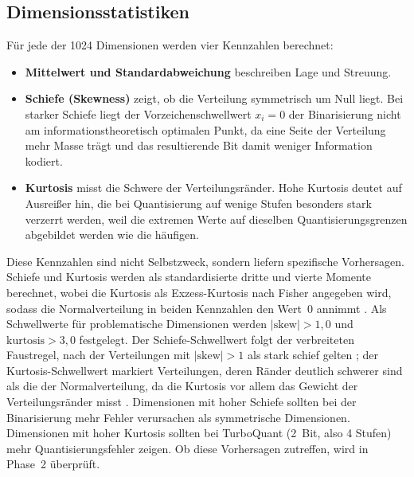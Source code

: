 \subsection{Dimensionsstatistiken}
\label{sec:methodik_dimstats}
%
Für jede der 1024 Dimensionen werden vier Kennzahlen berechnet:
\begin{itemize}
  \item \textbf{Mittelwert und Standardabweichung} beschreiben Lage und Streuung.
  \item \textbf{Schiefe (Skewness)} zeigt, ob die Verteilung symmetrisch um Null liegt.
Bei starker Schiefe liegt der Vorzeichenschwellwert $x_i = 0$ der Binarisierung nicht am informationstheoretisch optimalen Punkt, da eine Seite der Verteilung mehr Masse trägt und das resultierende Bit damit weniger Information kodiert.
  \item \textbf{Kurtosis} misst die Schwere der Verteilungsränder.
Hohe Kurtosis deutet auf Ausreißer hin, die bei Quantisierung auf wenige Stufen besonders stark verzerrt werden, weil die extremen Werte auf dieselben Quantisierungsgrenzen abgebildet werden wie die häufigen.
\end{itemize}
%
Diese Kennzahlen sind nicht Selbstzweck, sondern liefern spezifische Vorhersagen.
Schiefe und Kurtosis werden als standardisierte dritte und vierte Momente berechnet, wobei die Kurtosis als Exzess-Kurtosis nach Fisher angegeben wird, sodass die Normalverteilung in beiden Kennzahlen den Wert~0 annimmt \cite{joanes_1998_skewkurt}.
Als Schwellwerte für problematische Dimensionen werden $|\text{skew}| > 1{,}0$ und $\text{kurtosis} > 3{,}0$ festgelegt.
Der Schiefe-Schwellwert folgt der verbreiteten Faustregel, nach der Verteilungen mit $|\text{skew}| > 1$ als stark schief gelten \cite{bulmer_1979_statistics}; der Kurtosis-Schwellwert markiert Verteilungen, deren Ränder deutlich schwerer sind als die der Normalverteilung, da die Kurtosis vor allem das Gewicht der Verteilungsränder misst \cite{westfall_2014_kurtosis}.
Dimensionen mit hoher Schiefe sollten bei der Binarisierung mehr Fehler verursachen als symmetrische Dimensionen.
Dimensionen mit hoher Kurtosis sollten bei TurboQuant (2~Bit, also 4 Stufen) mehr Quantisierungsfehler zeigen.
Ob diese Vorhersagen zutreffen, wird in Phase~2 überprüft.
%
